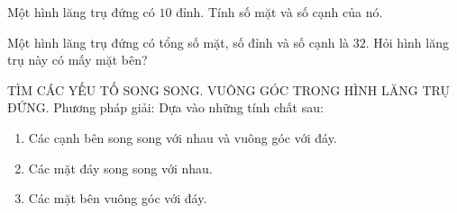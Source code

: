 \begin{vd}%
	Một hình lăng trụ đứng có $10$ đỉnh. Tính số mặt và số cạnh của nó.
\end{vd}
\begin{vd}%
Một hình lăng trụ đứng có tổng số mặt, số đỉnh và số cạnh là $32$. Hỏi hình lăng trụ này có mấy mặt bên?
\end{vd}
\begin{dang}{TÌM CÁC YẾU TỐ SONG SONG. VUÔNG GÓC TRONG HÌNH LĂNG TRỤ ĐỨNG.}
Phương pháp giải: Dựa vào những tính chất sau:
\begin{enumerate}[* ]  
\item Các cạnh bên song song với nhau và vuông góc với đáy.
\item   Các mặt đáy song song với nhau.
\item   Các mặt bên vuông góc với đáy.
\end{enumerate}
\end{dang}

